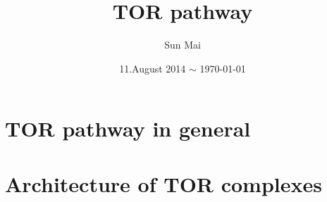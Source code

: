 \documentclass[a4paper, 11pt]{article}
\begin{document}
\title{TOR pathway}
\author{Sun Mai}
\date{11.August 2014 $\sim$ \today}
\maketitle

\pagestyle{fancy}
\fancyhead{}
\fancyhead[R]{\slshape \leftmark}
\fancyfoot[C]{\thepage}

\newpage
\tableofcontents

\newpage
\sloppy
\section{TOR pathway in general}
	\subsection{}
		\paragraph{}
\section{Architecture of TOR complexes}


\renewcommand{\bibname}{References} %
\end{document}
